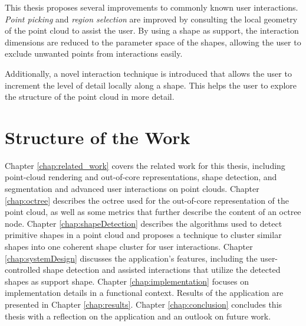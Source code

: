\par

This thesis proposes several improvements to commonly known user interactions. \textit{Point picking} and \textit{region selection} are improved by consulting the local geometry of the point cloud to assist the user. By using a shape as support, the interaction dimensions are reduced to the parameter space of the shapes, allowing the user to exclude unwanted points from interactions easily. 

\par

Additionally, a novel interaction technique is introduced that allows the user to increment the level of detail locally along a shape. This helps the user to explore the structure of the point cloud in more detail. 


\section{Structure of the Work}

Chapter \ref{chap:related_work} covers the related work for this thesis, including point-cloud rendering and out-of-core representations, shape detection, and segmentation and advanced user interactions on point clouds. Chapter \ref{chap:octree} describes the octree used for the out-of-core representation of the point cloud, as well as some metrics that further describe the content of an octree node. Chapter \ref{chap:shapeDetection} describes the algorithms used to detect primitive shapes in a point cloud and proposes a technique to cluster similar shapes into one coherent shape cluster for user interactions. Chapter \ref{chap:systemDesign} discusses the application's features, including the user-controlled shape detection and assisted interactions that utilize the detected shapes as support shape. Chapter \ref{chap:implementation} focuses on implementation details in a functional context. Results of the application are presented in Chapter \ref{chap:results}. Chapter \ref{chap:conclusion} concludes this thesis with a reflection on the application and an outlook on future work. 
